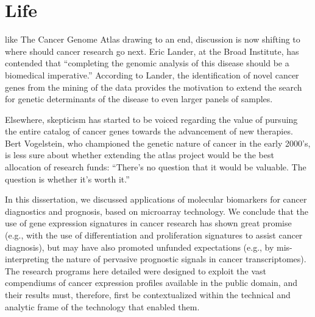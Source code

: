 \section{Life}
\label{life-discussion}

 like The Cancer Genome Atlas drawing to an end,
discussion is now shifting to where should cancer research go next.  Eric
Lander, at the Broad Institute, has contended that ``completing the genomic
analysis of this disease should be a biomedical
imperative.''\cite{lawrence_discovery_2014} According to Lander, the
identification of novel cancer genes from the mining of the 
data provides the motivation to extend the search for genetic determinants of
the disease to even larger panels of samples.

Elsewhere, skepticism has started to be voiced regarding the value of pursuing
the entire catalog of cancer genes towards the advancement of new therapies.
Bert Vogelstein, who championed the genetic nature of cancer in the early
2000's, is less sure about whether extending the atlas project would be the best
allocation of research funds: ``There’s no question that it would be
valuable. The question is whether it’s worth it.''\cite{zimmer_catalog_2014}

\medskip

In this dissertation, we discussed applications of molecular biomarkers for
cancer diagnostics and prognosis, based on microarray technology.  We conclude
that the use of gene expression signatures in cancer research has shown great
promise (e.g., with the use of differentiation and proliferation signatures to
assist cancer diagnosis), but may have also promoted unfunded expectations
(e.g., by mis-interpreting the nature of pervasive prognostic signals in cancer
transcriptomes).  The research programs here detailed were designed to exploit
the vast compendiums of cancer expression profiles available in the public
domain, and their results must, therefore, first be contextualized within the
technical and analytic frame of the technology that enabled them.


